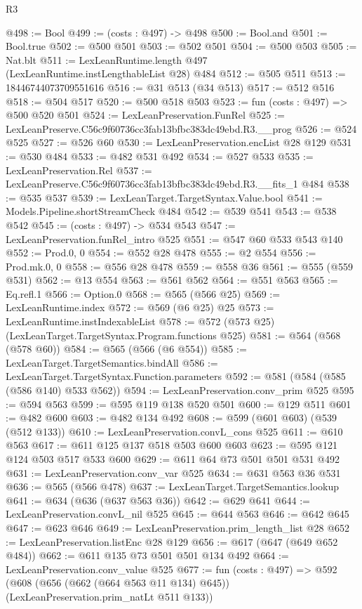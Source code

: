 \begin{lexlean}{R3}
\begin{coremodule}
@498 := Bool
@499 := (costs : @497) -> @498
@500 := Bool.and
@501 := Bool.true
@502 := @500 @501
@503 := @502 @501
@504 := @500 @503
@505 := Nat.blt
@511 := LexLeanRuntime.length @497 (LexLeanRuntime.instLengthableList @28) @484
@512 := @505 @511
@513 := 18446744073709551616
@516 := @31 @513 (@34 @513)
@517 := @512 @516
@518 := @504 @517
@520 := @500 @518 @503
@523 := fun (costs : @497) => @500 @520 @501
@524 := LexLeanPreservation.FunRel
@525 := LexLeanPreserve.C56c9f60736cc3fab13bfbc383dc49ebd.R3.__prog
@526 := @524 @525
@527 := @526 @60
@530 := LexLeanPreservation.encList @28 @129
@531 := @530 @484
@533 := @482 @531 @492
@534 := @527 @533
@535 := LexLeanPreservation.Rel
@537 := LexLeanPreserve.C56c9f60736cc3fab13bfbc383dc49ebd.R3.__fits_1 @484
@538 := @535 @537
@539 := LexLeanTarget.TargetSyntax.Value.bool
@541 := Models.Pipeline.shortStreamCheck @484
@542 := @539 @541
@543 := @538 @542
@545 := (costs : @497) -> @534 @543
@547 := LexLeanPreservation.funRel_intro @525
@551 := @547 @60 @533 @543 @140
@552 := Prod.{0, 0}
@554 := @552 @28 @478
@555 := @2 @554
@556 := Prod.mk.{0, 0}
@558 := @556 @28 @478
@559 := @558 @36
@561 := @555 (@559 @531)
@562 := @13 @554
@563 := @561 @562
@564 := @551 @563
@565 := Eq.refl.{1}
@566 := Option.{0}
@568 := @565 (@566 @25)
@569 := LexLeanRuntime.index
@572 := @569 (@6 @25) @25
@573 := LexLeanRuntime.instIndexableList
@578 := @572 (@573 @25) (LexLeanTarget.TargetSyntax.Program.functions @525)
@581 := @564 (@568 (@578 @60))
@584 := @565 (@566 (@6 @554))
@585 := LexLeanTarget.TargetSemantics.bindAll
@586 := LexLeanTarget.TargetSyntax.Function.parameters
@592 := @581 (@584 (@585 (@586 @140) @533 @562))
@594 := LexLeanPreservation.conv_prim @525
@595 := @594 @563
@599 := @595 @119 @138 @520 @501
@600 := @129 @511
@601 := @482 @600
@603 := @482 @134 @492
@608 := @599 (@601 @603) (@539 (@512 @133))
@610 := LexLeanPreservation.convL_cons @525
@611 := @610 @563
@617 := @611 @125 @137 @518 @503 @600 @603
@623 := @595 @121 @124 @503 @517 @533 @600
@629 := @611 @64 @73 @501 @501 @531 @492
@631 := LexLeanPreservation.conv_var @525
@634 := @631 @563 @36 @531
@636 := @565 (@566 @478)
@637 := LexLeanTarget.TargetSemantics.lookup
@641 := @634 (@636 (@637 @563 @36))
@642 := @629 @641
@644 := LexLeanPreservation.convL_nil @525
@645 := @644 @563
@646 := @642 @645
@647 := @623 @646
@649 := LexLeanPreservation.prim_length_list @28
@652 := LexLeanPreservation.listEnc @28 @129
@656 := @617 (@647 (@649 @652 @484))
@662 := @611 @135 @73 @501 @501 @134 @492
@664 := LexLeanPreservation.conv_value @525
@677 := fun (costs : @497) =>
  @592 (@608 (@656 (@662 (@664 @563 @11 @134) @645)) (LexLeanPreservation.prim_natLt @511 @133))

\end{coremodule}
\end{lexlean}

